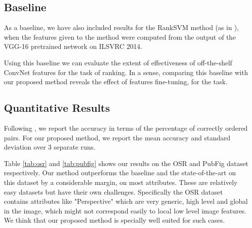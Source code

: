 \documentclass[runningheads]{llncs}
\begin{document}
\subsection{Baseline}

As a baseline, we have also included results for the RankSVM method (as in \cite{parikh2011}), when the features given to the method were computed from the output of the VGG-16 pretrained network on ILSVRC 2014. 

Using this baseline we can evaluate the extent of effectiveness of off-the-shelf ConvNet features \cite{offtheshelf}  for the task of ranking. In a sense, comparing this baseline with our proposed method reveals the effect of features fine-tuning, for the task. 

\subsection{Quantitative Results}

Following \cite{parikh2011,Yu2014,Sandeep_2014_CVPR}, we report the accuracy in terms of the percentage of correctly ordered pairs. For our proposed method, we report the mean accuracy and standard deviation over 3 separate runs. 

Table \ref{tab:osr} and \ref{tab:pubfig} shows our results on the OSR and PubFig dataset respectively. Our method outperforms the baseline and the state-of-the-art on this dataset by a considerable margin, on most attributes. These are relatively easy datasets but have their own challenges. Specifically the OSR dataset contains attributes like "Perspective" which are very generic, high level and global in the image, which might not correspond easily to local low level image features.
We think that our proposed method is specially well suited for such cases. 
\end{document}
